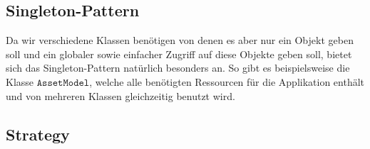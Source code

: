 \subsection{Singleton-Pattern}
Da wir verschiedene Klassen benötigen von denen es aber nur ein Objekt geben soll und ein globaler sowie einfacher Zugriff auf diese Objekte geben soll, bietet sich das Singleton-Pattern natürlich besonders an. So gibt es beispielsweise die Klasse $\texttt{AssetModel}$, welche alle benötigten Ressourcen für die Applikation enthält und von mehreren Klassen gleichzeitig benutzt wird.

\subsection{Strategy}

